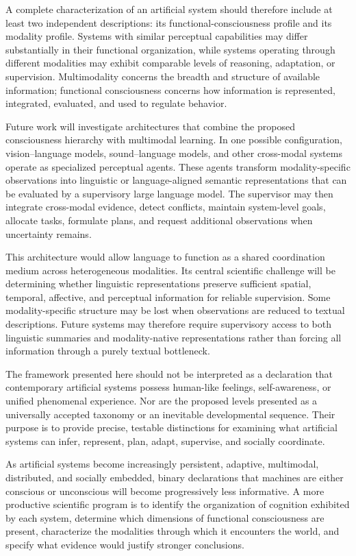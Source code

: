 A complete characterization of an artificial system should therefore include at least two independent descriptions: its functional-consciousness profile and its modality profile. Systems with similar perceptual capabilities may differ substantially in their functional organization, while systems operating through different modalities may exhibit comparable levels of reasoning, adaptation, or supervision. Multimodality concerns the breadth and structure of available information; functional consciousness concerns how information is represented, integrated, evaluated, and used to regulate behavior.

Future work will investigate architectures that combine the proposed consciousness hierarchy with multimodal learning. In one possible configuration, vision–language models, sound–language models, and other cross-modal systems operate as specialized perceptual agents. These agents transform modality-specific observations into linguistic or language-aligned semantic representations that can be evaluated by a supervisory large language model. The supervisor may then integrate cross-modal evidence, detect conflicts, maintain system-level goals, allocate tasks, formulate plans, and request additional observations when uncertainty remains.

This architecture would allow language to function as a shared coordination medium across heterogeneous modalities. Its central scientific challenge will be determining whether linguistic representations preserve sufficient spatial, temporal, affective, and perceptual information for reliable supervision. Some modality-specific structure may be lost when observations are reduced to textual descriptions. Future systems may therefore require supervisory access to both linguistic summaries and modality-native representations rather than forcing all information through a purely textual bottleneck.

The framework presented here should not be interpreted as a declaration that contemporary artificial systems possess human-like feelings, self-awareness, or unified phenomenal experience. Nor are the proposed levels presented as a universally accepted taxonomy or an inevitable developmental sequence. Their purpose is to provide precise, testable distinctions for examining what artificial systems can infer, represent, plan, adapt, supervise, and socially coordinate.

As artificial systems become increasingly persistent, adaptive, multimodal, distributed, and socially embedded, binary declarations that machines are either conscious or unconscious will become progressively less informative. A more productive scientific program is to identify the organization of cognition exhibited by each system, determine which dimensions of functional consciousness are present, characterize the modalities through which it encounters the world, and specify what evidence would justify stronger conclusions.

